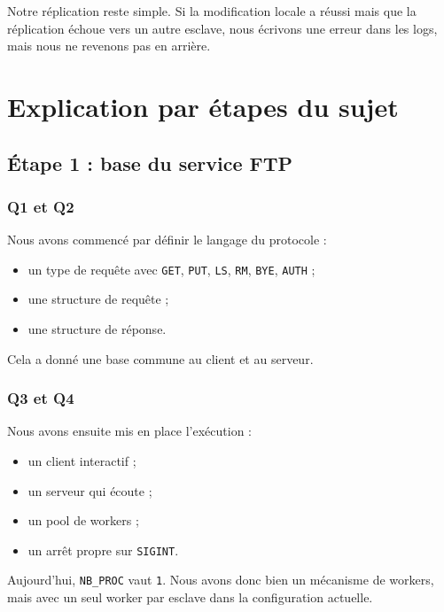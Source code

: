 \documentclass[a4paper,11pt]{article}
\begin{document}
\begin{warningbox}
Notre réplication reste simple. Si la modification locale a réussi mais que la
réplication échoue vers un autre esclave, nous écrivons une erreur dans les
logs, mais nous ne revenons pas en arrière.
\end{warningbox}
\newpage
\section{Explication par étapes du sujet}

\subsection{Étape 1 : base du service FTP}

\subsubsection{Q1 et Q2}

Nous avons commencé par définir le langage du protocole :

\begin{itemize}[leftmargin=*]
    \item un type de requête avec \texttt{GET}, \texttt{PUT}, \texttt{LS},
    \texttt{RM}, \texttt{BYE}, \texttt{AUTH} ;
    \item une structure de requête ;
    \item une structure de réponse.
\end{itemize}

Cela a donné une base commune au client et au serveur.

\subsubsection{Q3 et Q4}

Nous avons ensuite mis en place l'exécution :

\begin{itemize}[leftmargin=*]
    \item un client interactif ;
    \item un serveur qui écoute ;
    \item un pool de workers ;
    \item un arrêt propre sur \texttt{SIGINT}.
\end{itemize}

Aujourd'hui, \texttt{NB\_PROC} vaut \texttt{1}. Nous avons donc bien un
mécanisme de workers, mais avec un seul worker par esclave dans la
configuration actuelle.
\end{document}
